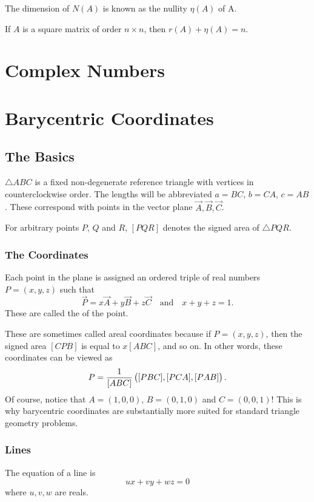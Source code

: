 The dimension of $N(A)$ is known as the nullity $\eta (A)$ of A.

If $A$ is a square matrix of order $n \times n$, then $r(A) + \eta (A) = n$.
\pagebreak

\section{Complex Numbers}
\pagebreak

\section{Barycentric Coordinates}
\subsection{The Basics}
$\triangle ABC$ is a fixed non-degenerate reference triangle with vertices in counterclockwise order. The lengths will be abbreviated $a=BC$, $b=CA$, $c=AB$. These correspond with points in the vector plane $\vec{A}, \vec{B}, \vec{C}$.

For arbitrary points $P$, $Q$ and $R$, $[PQR]$ denotes the signed area of $\triangle PQR$.

\subsubsection{The Coordinates}
\begin{definition}
Each point in the plane is assigned an ordered triple of real numbers $P=(x,y,z)$ such that
\[ \vec{P} = x\vec{A} + y\vec{B} + z\vec{C} \quad \text{and} \quad x + y + z = 1. \]
These are called the  of the point.
\end{definition}

These are sometimes called areal coordinates because if $P=(x,y,z)$, then the signed area $[CPB]$ is equal to $x[ABC]$, and so on. In other words, these coordinates can be viewed as
\[P=\frac{1}{[ABC]}\left([PBC],[PCA],[PAB]\right).\]
Of course, notice that $A=(1,0,0)$, $B=(0,1,0)$ and $C=(0,0,1)$! This is why barycentric coordinates are substantially more suited for standard triangle geometry problems.

\subsubsection{Lines}
\begin{theorem}[Line]
The equation of a line is
\[ux+vy+wz=0\]
where $u,v,w$ are reals.
\end{theorem}

